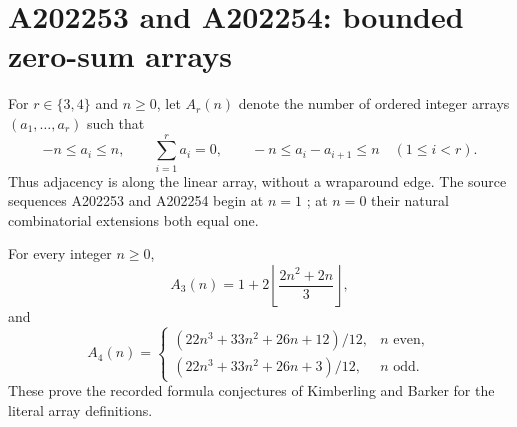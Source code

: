 \section{A202253 and A202254: bounded zero-sum arrays}

For $r\in\{3,4\}$ and $n\ge0$, let $A_r(n)$ denote the number of
ordered integer arrays $(a_1,\ldots,a_r)$ such that
\[
 -n\le a_i\le n,\qquad \sum_{i=1}^r a_i=0,\qquad
 -n\le a_i-a_{i+1}\le n\quad(1\le i<r).
\]
Thus adjacency is along the linear array, without a wraparound edge.
The source sequences A202253 and A202254 begin at $n=1$
\cite{a202253-source,a202254-source}; at $n=0$ their natural
combinatorial extensions both equal one.

\begin{theorem}\label{thm:bounded-zero-sum}
For every integer $n\ge0$,
\[
 A_3(n)=1+2\left\lfloor\frac{2n^2+2n}{3}\right\rfloor,
\]
and
\[
 A_4(n)=
 \begin{cases}
 (22n^3+33n^2+26n+12)/12,&n\text{ even},\\
 (22n^3+33n^2+26n+3)/12,&n\text{ odd}.
 \end{cases}
\]
These prove the recorded formula conjectures of Kimberling and Barker
for the literal array definitions.
\end{theorem}

